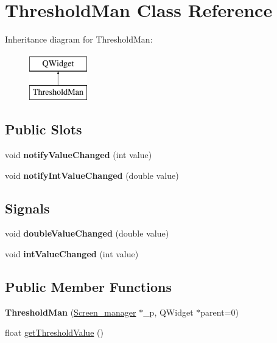 \hypertarget{classThresholdMan}{}\section{Threshold\+Man Class Reference}
\label{classThresholdMan}
Inheritance diagram for Threshold\+Man\+:\begin{figure}[H]
\begin{center}
\leavevmode
\includegraphics[height=2.000000cm]{classThresholdMan}
\end{center}
\end{figure}
\subsection*{Public Slots}
\begin{DoxyCompactItemize}
\item 
\mbox{\label{classThresholdMan_a46424217b012608d39f365fec7881315}} 
void {\bfseries notify\+Value\+Changed} (int value)
\item 
\mbox{\label{classThresholdMan_a35de41fade07efb313b22ccfabcb49c2}} 
void {\bfseries notify\+Int\+Value\+Changed} (double value)
\end{DoxyCompactItemize}
\subsection*{Signals}
\begin{DoxyCompactItemize}
\item 
\mbox{\label{classThresholdMan_a08132244c52a0a51d2cd6f4019508e34}} 
void {\bfseries double\+Value\+Changed} (double value)
\item 
\mbox{\label{classThresholdMan_a33b5f9611dc6dba2c9fed171d7c35f77}} 
void {\bfseries int\+Value\+Changed} (int value)
\end{DoxyCompactItemize}
\subsection*{Public Member Functions}
\begin{DoxyCompactItemize}
\item 
\mbox{\label{classThresholdMan_a6a5c7632349045654bf3c8fcb3f16e85}} 
{\bfseries Threshold\+Man} (\mbox{\hyperlink{classScreen__manager}{Screen\+\_\+manager}} $\ast$\+\_\+p, Q\+Widget $\ast$parent=0)
\item 
float \mbox{\hyperlink{classThresholdMan_a86ada2cb5a498fe86616031d1f5e0fc8}{get\+Threshold\+Value}} ()
\end{DoxyCompactItemize}
